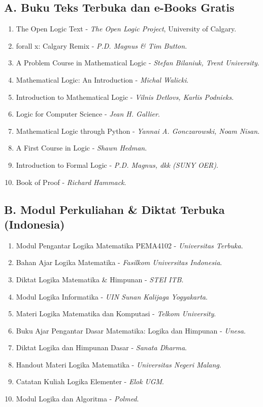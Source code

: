 \documentclass[12pt,a4paper]{article}
\begin{document}
\subsection*{A. Buku Teks Terbuka dan e-Books Gratis}
\begin{enumerate}[leftmargin=*, label={A\arabic*.}]
  \item The Open Logic Text - \textit{The Open Logic Project}, University of Calgary.
  \item forall x: Calgary Remix - \textit{P.D. Magnus \& Tim Button}.
  \item A Problem Course in Mathematical Logic - \textit{Stefan Bilaniuk, Trent University}.
  \item Mathematical Logic: An Introduction - \textit{Michal Walicki}.
  \item Introduction to Mathematical Logic - \textit{Vilnis Detlovs, Karlis Podnieks}.
  \item Logic for Computer Science - \textit{Jean H. Gallier}.
  \item Mathematical Logic through Python - \textit{Yannai A. Gonczarowski, Noam Nisan}.
  \item A First Course in Logic - \textit{Shawn Hedman}.
  \item Introduction to Formal Logic - \textit{P.D. Magnus, dkk (SUNY OER)}.
  \item Book of Proof - \textit{Richard Hammack}.
\end{enumerate}

\subsection*{B. Modul Perkuliahan \& Diktat Terbuka (Indonesia)}
\begin{enumerate}[leftmargin=*, label={B\arabic*.}]
  \item Modul Pengantar Logika Matematika PEMA4102 - \textit{Universitas Terbuka}.
  \item Bahan Ajar Logika Matematika - \textit{Fasilkom Universitas Indonesia}.
  \item Diktat Logika Matematika \& Himpunan - \textit{STEI ITB}.
  \item Modul Logika Informatika - \textit{UIN Sunan Kalijaga Yogyakarta}.
  \item Materi Logika Matematika dan Komputasi - \textit{Telkom University}.
  \item Buku Ajar Pengantar Dasar Matematika: Logika dan Himpunan - \textit{Unesa}.
  \item Diktat Logika dan Himpunan Dasar - \textit{Sanata Dharma}.
  \item Handout Materi Logika Matematika - \textit{Universitas Negeri Malang}.
  \item Catatan Kuliah Logika Elementer - \textit{Elok UGM}.
  \item Modul Logika dan Algoritma - \textit{Polmed}.
\end{enumerate}
\end{document}
